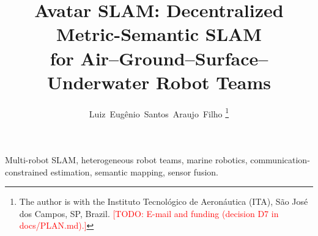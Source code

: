 \documentclass[journal]{IEEEtran}
\newcommand{\todo}[1]{\textcolor{red}{[TODO: #1]}}
\begin{document}
\title{Avatar SLAM: Decentralized Metric-Semantic SLAM\\ for Air--Ground--Surface--Underwater Robot Teams}

\author{Luiz~Eug\^enio~Santos~Araujo~Filho%
\thanks{The author is with the Instituto Tecnol\'ogico de Aeron\'autica (ITA),
S\~ao Jos\'e dos Campos, SP, Brazil. \todo{E-mail and funding (decision D7 in docs/PLAN.md).}}}


\maketitle

\begin{abstract}

\end{abstract}

\begin{IEEEkeywords}
Multi-robot SLAM, heterogeneous robot teams, marine robotics, communication-constrained
estimation, semantic mapping, sensor fusion.
\end{IEEEkeywords}














\end{document}
